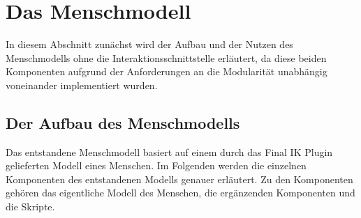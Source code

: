 \section{Das Menschmodell}\label{sec:DasMenschmodell}
In diesem Abschnitt zunächst wird der Aufbau und der Nutzen des Menschmodells ohne die Interaktionsschnittstelle erläutert, da diese beiden Komponenten aufgrund der Anforderungen an die Modularität unabhängig voneinander implementiert wurden.

\subsection{Der Aufbau des Menschmodells}\label{sec:MMAufbau}
Das entstandene Menschmodell basiert auf einem durch das Final IK Plugin gelieferten Modell eines Menschen. Im Folgenden werden die einzelnen Komponenten des entstandenen Modells genauer erläutert. Zu den Komponenten gehören das eigentliche Modell des Menschen, die ergänzenden Komponenten und die Skripte.

